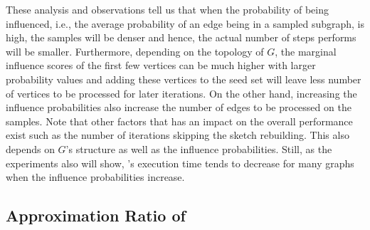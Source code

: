 These analysis and observations tell us that when the probability of being influenced, i.e., the average probability of an edge being in a sampled subgraph, is high, the samples will be denser and hence, the actual number of steps \acro performs will be smaller. Furthermore, depending on the topology of $G$, the marginal influence scores of the first few vertices can be much higher with larger probability values and adding these vertices to the seed set will leave less number of vertices to be processed for later iterations. On the other hand, increasing the influence probabilities also increase the number of edges to be processed on the samples. Note that other factors that has an impact on the overall performance exist such as the number of iterations skipping the sketch rebuilding. This also depends on $G$'s structure as well as the influence probabilities. Still, as the experiments also will show, \acro's execution time tends to decrease for many graphs when the influence probabilities increase.

%  






\subsection{Approximation Ratio of \acro} 

